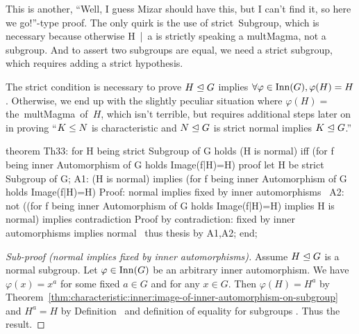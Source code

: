 \begin{thm-remark}
This is another, ``Well, I guess Mizar should have this, but I can't
find it, so here we go!''-type proof. The only quirk is the use of
{\Tt{}strict\ Subgroup\nwendquote}, which is necessary because otherwise {\Tt{}H\ |{}\ a\nwendquote} is
strictly speaking a {\Tt{}multMagma\nwendquote}, not a subgroup. And to assert two
subgroups are equal, we need a {\Tt{}strict\nwendquote} subgroup, which requires
adding a {\Tt{}strict\nwendquote} hypothesis.
\end{thm-remark}

\begin{thm-remark}
The {\Tt{}strict\nwendquote} condition is necessary to prove $H\trianglelefteq G$
implies $\forall\varphi\in\operatorname{Inn}(G),\varphi(H)=H$. Otherwise, we end up
with the slightly peculiar situation where $\varphi(H) = $
{\Tt{}the\ multMagma\ of\ \nwendquote}$H$, which isn't terrible, but requires additional
steps later on in proving ``$K\leq N$ is characteristic and
$N\trianglelefteq G$ is {\Tt{}strict\nwendquote} normal implies $K\trianglelefteq G$.''
\end{thm-remark}

\nwenddocs{}\endmoddef\nwstartdeflinemarkup{}\nwenddeflinemarkup
theorem Th33:
  for H being strict Subgroup of G
  holds (H is normal) iff (for f being inner Automorphism of G
                           holds Image(f|H)=H)
proof
  let H be strict Subgroup of G;
  A1: (H is normal) implies (for f being inner Automorphism of G
                             holds Image(f|H)=H)
  \LA{}Proof: normal implies fixed by inner automorphisms~{\nwtagstyle{}}\RA{}
  A2: not ((for f being inner Automorphism of G holds Image(f|H)=H)
           implies H is normal)
  implies contradiction
  \LA{}Proof by contradiction: fixed by inner automorphisms implies normal~{\nwtagstyle{}}\RA{}
  thus thesis by A1,A2;
end;
\eatline
{}\nwendcode{}\nwdocspar
\begin{proof}[Sub-proof (normal implies fixed by inner automorphisms)]
Assume $H\trianglelefteq G$ is a normal subgroup. Let
$\varphi\in\operatorname{Inn}(G)$ be an arbitrary inner automorphism. We have
$\varphi(x)=x^{a}$ for some fixed $a\in G$ and for any $x\in G$. Then
$\varphi(H) = H^{a}$ by Theorem~\ref{thm:characteristic:inner:image-of-inner-automorphism-on-subgroup} and $H^{a}=H$ by Definition~%
 and definition of equality for
subgroups . Thus the result.
\end{proof}

